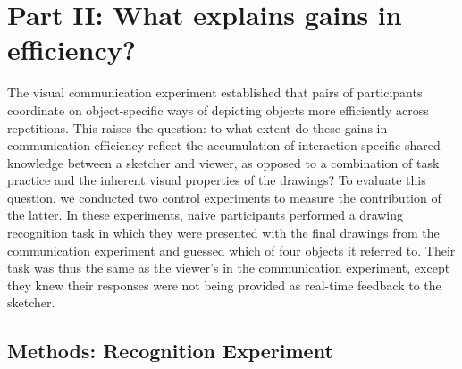 \documentclass[10pt,letterpaper]{article}
\begin{document}




\section{Part II: What explains gains in efficiency?}

The visual communication experiment established that pairs of participants coordinate on object-specific ways of depicting objects more efficiently across repetitions.  
This raises the question: to what extent do these gains in communication efficiency reflect the accumulation of interaction-specific shared knowledge between a sketcher and viewer, as opposed to a combination of task practice and the inherent visual properties of the drawings? 
To evaluate this question, we conducted two control experiments to measure the contribution of the latter. 
In these experiments, naive participants performed a drawing recognition task in which they were presented with the final drawings from the communication experiment and guessed which of four objects it referred to. 
Their task was thus the same as the viewer's in the communication experiment, except they knew their responses were not being provided as real-time feedback to the sketcher.


\subsection{Methods: Recognition Experiment}
\end{document}
